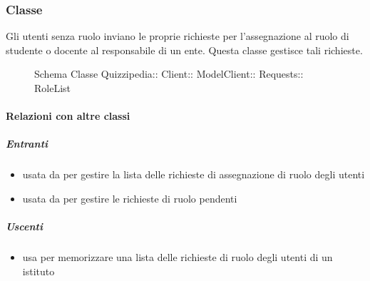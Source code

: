 \subsubsection{Classe }
Gli utenti senza ruolo inviano le proprie richieste per l'assegnazione al ruolo di studente o docente al responsabile di un ente. Questa classe gestisce tali richieste.
\begin{figure}[H]
\centering
\noindent{}
\caption[Schema Classe RoleList]{Schema Classe Quizzipedia:: Client:: ModelClient:: Requests:: RoleList}
\end{figure}
\paragraph{Relazioni con altre classi}
\subparagraph{Entranti}
\begin{itemize}
\item usata da  per gestire la lista delle richieste di assegnazione di ruolo degli utenti
\item usata da  per gestire le richieste di ruolo pendenti
\end{itemize}
\subparagraph{Uscenti}
\begin{itemize}
\item usa  per memorizzare una lista delle richieste di ruolo degli utenti di un istituto
\end{itemize}
